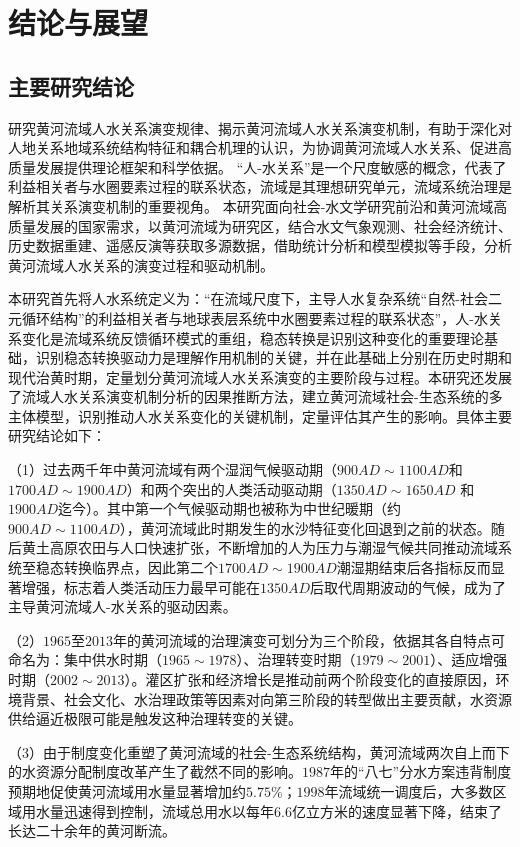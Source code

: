 \chapter{结论与展望}

\section{主要研究结论}

研究黄河流域人水关系演变规律、揭示黄河流域人水关系演变机制，有助于深化对人地关系地域系统结构特征和耦合机理的认识，为协调黄河流域人水关系、促进高质量发展提供理论框架和科学依据。
“人-水关系”是一个尺度敏感的概念，代表了利益相关者与水圈要素过程的联系状态，流域是其理想研究单元，流域系统治理是解析其关系演变机制的重要视角。
本研究面向社会-水文学研究前沿和黄河流域高质量发展的国家需求，以黄河流域为研究区，结合水文气象观测、社会经济统计、历史数据重建、遥感反演等获取多源数据，借助统计分析和模型模拟等手段，分析黄河流域人水关系的演变过程和驱动机制。

本研究首先将人水系统定义为：“在流域尺度下，主导人水复杂系统“自然-社会二元循环结构”的利益相关者与地球表层系统中水圈要素过程的联系状态”，人-水关系变化是流域系统反馈循环模式的重组，稳态转换是识别这种变化的重要理论基础，识别稳态转换驱动力是理解作用机制的关键，并在此基础上分别在历史时期和现代治黄时期，定量划分黄河流域人水关系演变的主要阶段与过程。本研究还发展了流域人水关系演变机制分析的因果推断方法，建立黄河流域社会-生态系统的多主体模型，识别推动人水关系变化的关键机制，定量评估其产生的影响。具体主要研究结论如下：

（1）过去两千年中黄河流域有两个湿润气候驱动期（$900AD\sim1100AD$和$1700AD\sim1900AD$）和两个突出的人类活动驱动期（$1350AD \sim 1650AD$ 和 $1900AD$迄今）。其中第一个气候驱动期也被称为中世纪暖期（约$900AD \sim 1100AD$），黄河流域此时期发生的水沙特征变化回退到之前的状态。随后黄土高原农田与人口快速扩张，不断增加的人为压力与潮湿气候共同推动流域系统至稳态转换临界点，因此第二个$1700AD \sim 1900AD$潮湿期结束后各指标反而显著增强，标志着人类活动压力最早可能在$1350AD$后取代周期波动的气候，成为了主导黄河流域人-水关系的驱动因素。

（2）$1965$至$2013$年的黄河流域的治理演变可划分为三个阶段，依据其各自特点可命名为：集中供水时期（$1965 \sim 1978$）、治理转变时期（$1979 \sim 2001$）、适应增强时期（$2002 \sim 2013$）。灌区扩张和经济增长是推动前两个阶段变化的直接原因，环境背景、社会文化、水治理政策等因素对向第三阶段的转型做出主要贡献，水资源供给逼近极限可能是触发这种治理转变的关键。

（3）由于制度变化重塑了黄河流域的社会-生态系统结构，黄河流域两次自上而下的水资源分配制度改革产生了截然不同的影响。$1987$年的“八七”分水方案违背制度预期地促使黄河流域用水量显著增加约$5.75\%$；$1998$年流域统一调度后，大多数区域用水量迅速得到控制，流域总用水以每年$6.6$亿立方米的速度显著下降，结束了长达二十余年的黄河断流。

